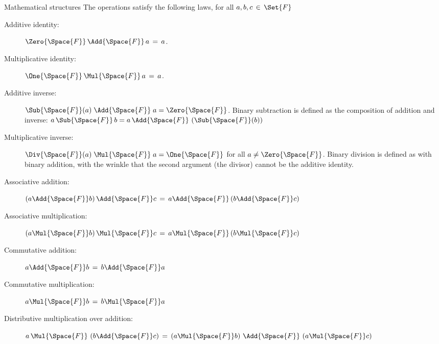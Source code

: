 \documentclass[12pt]{PalisadesLakesBook}
\begin{document}
\begin{plSection}{Mathematical structures}
The operations satisfy the following laws, for all 
$a, b, c \,\in \, \Set{F}$
\begin{description}

\item[Additive identity:] 
$\Zero{\Space{F}} \,\Add{\Space{F}}\, a \,=\, a$.

\item[Multiplicative identity:] 
$\One{\Space{F}} \,\Mul{\Space{F}}\, a \,=\, a$.

\item[Additive inverse:] 
$\Sub{\Space{F}}(a) \;\Add{\Space{F}}\; a = \Zero{\Space{F}}$.
Binary subtraction is defined as the composition 
of addition and inverse:
$a \,\Sub{\Space{F}}\, b = 
a \,\Add{\Space{F}}\, \left(\Sub{\Space{F}}(b)\right) $

\item[Multiplicative inverse:] 
$\Div{\Space{F}}(a) \;\Mul{\Space{F}}\; a = \One{\Space{F}}$ 
for all $a \neq \Zero{\Space{F}}$.
Binary division is defined as with binary addition,
with the wrinkle that the second argument (the divisor)
cannot be the additive identity.

\item[Associative addition:] 
$\left( a \Add{\Space{F}} b \right)  \Add{\Space{F}} c 
\,=\, 
a  \Add{\Space{F}} \left( b  \Add{\Space{F}} c \right)$

\item[Associative multiplication:] 
$\left( a  \Mul{\Space{F}} b \right) \Mul{\Space{F}} c 
\,=\, 
a \Mul{\Space{F}} \left( b \Mul{\Space{F}} c \right)$

\item[Commutative addition:] 
$a \Add{\Space{F}} b \,=\, b \Add{\Space{F}} a$

\item[Commutative multiplication:] 
$a \Mul{\Space{F}} b \,=\, b \Mul{\Space{F}} a$

\item[Distributive multiplication over addition:] 
$a \, \Mul{\Space{F}} \, \left( b \Add{\Space{F}} c \right)
\,=\, 
\left(a \Mul{\Space{F}} b \right) 
\, \Add{\Space{F}} \, 
\left(a \Mul{\Space{F}} c \right)$

\end{description}

\end{plSection}%
\end{document}
